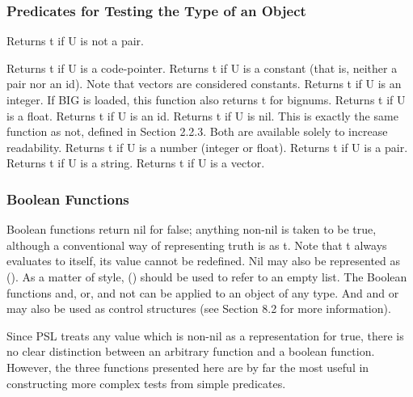 \subsubsection{Predicates for Testing the Type of an Object}

{    Returns t if U is not a pair.
}

{    Returns t if U is a code-pointer.
}
{    Returns t if U is a constant (that is, neither a pair nor an
    id).  Note that vectors are considered constants.
}
{    Returns t if U is an  integer.    If  BIG  is  loaded,  this
    function also returns t for bignums.
}
{    Returns t if U is a float.
}
{    Returns t if U is an id.
}
{    Returns  t    if  U    is  nil.  This  is exactly  the  same
    function as  not, defined  in Section   2.2.3.   Both    are
    available  solely  to  increase  readability.
}
{    Returns t if U is a number (integer or float).
}
{    Returns t if U is a pair.
}
{    Returns t if U is a string.
}
{    Returns t if U is a vector.
}
\subsubsection{Boolean Functions}

Boolean  functions  return  nil for false; anything non-nil is
taken to be true, although a conventional  way  of  representing
truth  is  as  t.   Note  that t always evaluates to itself, its
value cannot be redefined.  Nil may also be represented  as  ().
As  a  matter  of  style, () should be used to refer to an empty
list.  The Boolean functions and, or, and not can be applied  to
an  object  of any type.  And and or may also be used as control
structures (see Section 8.2 for more information).

\noindent
Since  PSL  treats  any  value   which   is   non-nil   as   a
representation  for  true, there is no clear distinction between
an arbitrary function and a  boolean  function.    However,  the
three  functions  presented  here  are by far the most useful in
constructing more complex tests from simple predicates.



